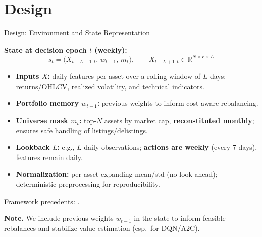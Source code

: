 \documentclass[aspectratio=169]{beamer}
\begin{document}
\section{Design}

\begin{frame}{Design: Environment and State Representation}
\small

\textbf{State at decision epoch $t$ (weekly):}
\[
  s_t=\big(X_{t-L+1:t},\,w_{t-1},\,m_t\big),
  \qquad X_{t-L+1:t}\in\mathbb{R}^{N\times F\times L}
\]

\begin{itemize}\setlength{\itemsep}{3pt}
  \item \textbf{Inputs $X$:} daily features per asset over a rolling window of $L$ days:  
        returns/OHLCV, realized volatility, and technical indicators.
  \item \textbf{Portfolio memory $w_{t-1}$:} previous weights to inform cost-aware rebalancing.
  \item \textbf{Universe mask $m_t$:} top-$N$ assets by market cap, \textbf{reconstituted monthly}; ensures safe handling of listings/delistings.
  \item \textbf{Lookback $L$:} e.g., $L$ daily observations; \textbf{actions are weekly} (every 7 days), features remain daily.
  \item \textbf{Normalization:} per-asset expanding mean/std (no look-ahead); deterministic preprocessing for reproducibility.
\end{itemize}

\footnotesize Framework precedents: \citep{jiang2017framework,jiang2017cryptocurrency,betancourt2021dynamic}.

\vspace{0.3em}
{\scriptsize \textbf{Note.} We include previous weights $w_{t-1}$ in the state to inform feasible rebalances and stabilize value estimation (esp.\ for DQN/A2C).}
\end{frame}
\end{document}
